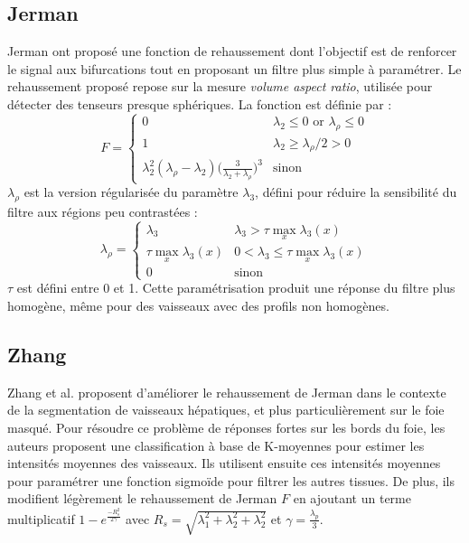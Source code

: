 \subsection{Jerman}

Jerman \etal ont proposé une fonction de rehaussement dont l'objectif est de renforcer le signal aux bifurcations tout en proposant un filtre plus simple à paramétrer. Le rehaussement proposé repose sur la mesure \textit{volume aspect ratio}, utilisée pour détecter des tenseurs presque sphériques. La fonction est définie par :
\begin{equation}
\nonumber
  F =
\left\{
  \begin{array}{lr}
    0 & \lambda_2 \leqslant 0 \textrm{~or~} \lambda_\rho \leqslant 0 \\
    1 & \lambda_2 \geqslant \lambda_\rho / 2 > 0 \\
    \lambda_2^2(\lambda_\rho -\lambda_2)\big(\frac{3}{\lambda_2+\lambda_\rho}\big)^3 & \textrm{sinon}
  \end{array}
  \right. 
\end{equation}
$\lambda_\rho$ est la version régularisée du paramètre $\lambda_3$, défini pour réduire la sensibilité du filtre aux régions peu contrastées :
\begin{equation}
\nonumber
  \lambda_\rho =
  \left\{
  \begin{array}{lr}
     \lambda_3  & \lambda_3 > \tau \max_{x} \lambda_3(x) \\
    \tau \max_{x} \lambda_3(x) & 0 < \lambda_3 \leqslant \tau \max_{x} \lambda_3(x) \\
    0  & \textrm{sinon}
  \end{array}
\right.
\end{equation}
$\tau$ est défini entre 0 et 1. Cette paramétrisation produit une réponse du filtre plus homogène, même pour des vaisseaux avec des profils non homogènes.

\subsection{Zhang}

Zhang et al. proposent d'améliorer le rehaussement de Jerman dans le contexte de la segmentation de vaisseaux hépatiques, et plus particulièrement sur le foie masqué. Pour résoudre ce problème de réponses fortes sur les bords du foie, les auteurs proposent une classification à base de K-moyennes pour estimer les intensités moyennes des vaisseaux. Ils utilisent ensuite ces intensités moyennes pour paramétrer une fonction sigmoïde pour filtrer les autres tissues. De plus, ils modifient légèrement le rehaussement de Jerman $F$ en ajoutant un terme multiplicatif $1-e^{ \frac{-R^2_s}{2 \gamma}}$ avec $R_s = \sqrt{\lambda^2_1 + \lambda^2_2 + \lambda^2_2}$ et $\gamma= \frac{\lambda_p}{3}$.


